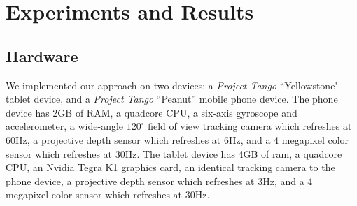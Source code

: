 \documentclass[conference]{IEEEtran}
\begin{document}
\section{Experiments and Results}
\label{section:experiments}
\subsection{Hardware}
\label{section:hardware}
We implemented our approach on two devices: a \textit{Project Tango}
``Yellowstone" tablet device, and a \textit{Project Tango} ``Peanut'' mobile 
phone device. The phone device has 2GB of RAM, a quadcore
CPU, a six-axis gyroscope and accelerometer, a wide-angle $120^\circ$ field of
view tracking camera which refreshes at 60Hz, a projective depth sensor which
refreshes at 6Hz, and a 4 megapixel color sensor which refreshes at 30Hz. The
tablet device has 4GB of ram, a quadcore CPU, an Nvidia Tegra K1 graphics card,
an identical tracking camera to the phone device, a projective depth sensor
which refreshes at 3Hz, and a 4 megapixel color sensor which refreshes at 30Hz.
\end{document}
